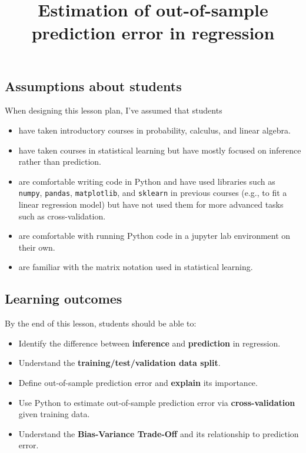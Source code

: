 \documentclass[
  letterpaper,
  DIV=11,
  numbers=noendperiod]{scrartcl}
\title{Estimation of out-of-sample prediction error in regression}
\author{}
\date{}
\providecommand{\tightlist}{%
  \setlength{\itemsep}{0pt}\setlength{\parskip}{0pt}}\usepackage{longtable,booktabs,array}
\begin{document}
\maketitle


\subsection{Assumptions about
students}\label{assumptions-about-students}

When designing this lesson plan, I've assumed that students

\begin{itemize}
\tightlist
\item
  have taken introductory courses in probability, calculus, and linear
  algebra.
\item
  have taken courses in statistical learning but have mostly focused on
  inference rather than prediction.\\
\item
  are comfortable writing code in Python and have used libraries such as
  \texttt{numpy}, \texttt{pandas}, \texttt{matplotlib}, and
  \texttt{sklearn} in previous courses (e.g., to fit a linear regression
  model) but have not used them for more advanced tasks such as
  cross-validation.
\item
  are comfortable with running Python code in a jupyter lab environment
  on their own.
\item
  are familiar with the matrix notation used in statistical learning.
\end{itemize}

\subsection{Learning outcomes}\label{learning-outcomes}

By the end of this lesson, students should be able to:

\begin{itemize}
\tightlist
\item
  Identify the difference between \textbf{inference} and
  \textbf{prediction} in regression.
\item
  Understand the \textbf{training/test/validation data split}.
\item
  Define out-of-sample prediction error and \textbf{explain} its
  importance.
\item
  Use Python to estimate out-of-sample prediction error via
  \textbf{cross-validation} given training data.
\item
  Understand the \textbf{Bias-Variance Trade-Off} and its relationship
  to prediction error.
\end{itemize}
\end{document}
